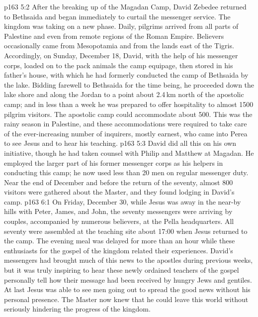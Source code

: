 \vs p163 5:2 After the breaking up of the Magadan Camp, David Zebedee returned to Bethsaida and began immediately to curtail the messenger service. The kingdom was taking on a new phase. Daily, pilgrims arrived from all parts of Palestine and even from remote regions of the Roman Empire. Believers occasionally came from Mesopotamia and from the lands east of the Tigris. Accordingly, on Sunday, December 18, David, with the help of his messenger corps, loaded on to the pack animals the camp equipage, then stored in his father’s house, with which he had formerly conducted the camp of Bethsaida by the lake. Bidding farewell to Bethsaida for the time being, he proceeded down the lake shore and along the Jordan to a point about 2.4\,km north of the apostolic camp; and in less than a week he was prepared to offer hospitality to almost 1500 pilgrim visitors. The apostolic camp could accommodate about 500. This was the rainy season in Palestine, and these accommodations were required to take care of the ever\hyp{}increasing number of inquirers, mostly earnest, who came into Perea to see Jesus and to hear his teaching.
\vs p163 5:3 David did all this on his own initiative, though he had taken counsel with Philip and Matthew at Magadan. He employed the larger part of his former messenger corps as his helpers in conducting this camp; he now used less than 20 men on regular messenger duty. Near the end of December and before the return of the seventy, almost 800 visitors were gathered about the Master, and they found lodging in David’s camp.
\vs p163 6:1 On Friday, December 30, while Jesus was away in the near\hyp{}by hills with Peter, James, and John, the seventy messengers were arriving by couples, accompanied by numerous believers, at the Pella headquarters. All seventy were assembled at the teaching site about 17:00 when Jesus returned to the camp. The evening meal was delayed for more than an hour while these enthusiasts for the gospel of the kingdom related their experiences. David’s messengers had brought much of this news to the apostles during previous weeks, but it was truly inspiring to hear these newly ordained teachers of the gospel personally tell how their message had been received by hungry Jews and gentiles. At last Jesus was able to see men going out to spread the good news without his personal presence. The Master now knew that he could leave this world without seriously hindering the progress of the kingdom.
